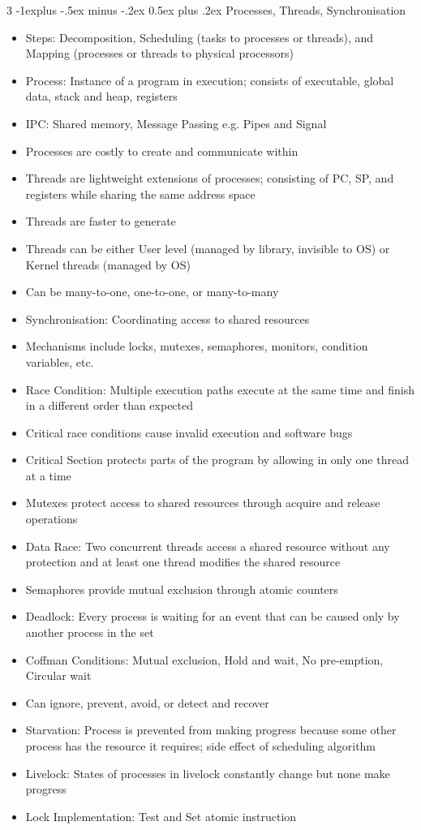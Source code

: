 \documentclass[10pt, landscape]{article}
\makeatletter
\renewcommand{\section}{\@startsection{section}{1}{0mm}%
                                {-1ex plus -.5ex minus -.2ex}%
                                {0.5ex plus .2ex}%
                                {\normalfont\large\bfseries}}
\renewcommand{\section}{\@startsection{section}{2}{0mm}%
                                {-1explus -.5ex minus -.2ex}%
                                {0.5ex plus .2ex}%
                                {\normalfont\normalsize\bfseries}}
\makeatother
\begin{document}
\begin{multicols*}{3}
\section{Processes, Threads, Synchronisation}
\begin{itemize}
    \item Steps: Decomposition, Scheduling (tasks to processes or threads), and Mapping (processes or threads to physical processors)
    \item Process: Instance of a program in execution; consists of executable, global data, stack and heap, registers
    \item IPC: Shared memory, Message Passing e.g. Pipes and Signal
    \item Processes are costly to create and communicate within
    \item Threads are lightweight extensions of processes; consisting of PC, SP, and registers while sharing the same address space
    \item Threads are faster to generate
    \item Threads can be either User level (managed by library, invisible to OS) or Kernel threads (managed by OS)
    \item Can be many-to-one, one-to-one, or many-to-many
    \item Synchronisation: Coordinating access to shared resources
    \item Mechanisms include locks, mutexes, semaphores, monitors, condition variables, etc.
    \item Race Condition: Multiple execution paths execute at the same time and finish in a different order than expected
    \item Critical race conditions cause invalid execution and software bugs
    \item Critical Section protects parts of the program by allowing in only one thread at a time
    \item Mutexes protect access to shared resources through acquire and release operations
    \item Data Race: Two concurrent threads access a shared resource without any protection and at least one thread modifies the shared resource
    \item Semaphores provide mutual exclusion through atomic counters
    \item Deadlock: Every process is waiting for an event that can be caused only by another process in the set
    \item Coffman Conditions: Mutual exclusion, Hold and wait, No pre-emption, Circular wait
    \item Can ignore, prevent, avoid, or detect and recover
    \item Starvation: Process is prevented from making progress because some other process has the resource it requires; side effect of scheduling algorithm
    \item Livelock: States of processes in livelock constantly change but none make progress
    \item Lock Implementation: Test and Set atomic instruction
\end{itemize}


\end{multicols*}
\end{document}
